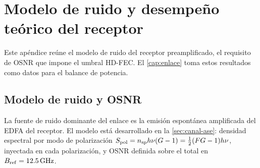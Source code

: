 \chapter{Modelo de ruido y desempe\~no te\'orico del receptor}
\label{ap:ruido}

Este ap\'endice re\'une el modelo de ruido del receptor preamplificado, el
requisito de OSNR que impone el umbral HD-FEC. El \cref{cap:enlace} toma estos resultados como datos para el balance de potencia.


\section{Modelo de ruido y OSNR}
\label{sec:enl-ruido}

La fuente de ruido dominante del enlace es la emisi\'on espont\'anea
amplificada del EDFA del receptor. El modelo est\'a
desarrollado en la \cref{sec:canal-ase}: densidad espectral por modo de
polarizaci\'on $S_{\mathrm{pol}} = n_{\mathrm{sp}} h\nu (G-1) = \tfrac12 (FG-1)h\nu$,
inyectada en cada polarizaci\'on, y OSNR definida sobre el total en
$B_{\mathrm{ref}} = \SI{12.5}{\giga\hertz}$.

